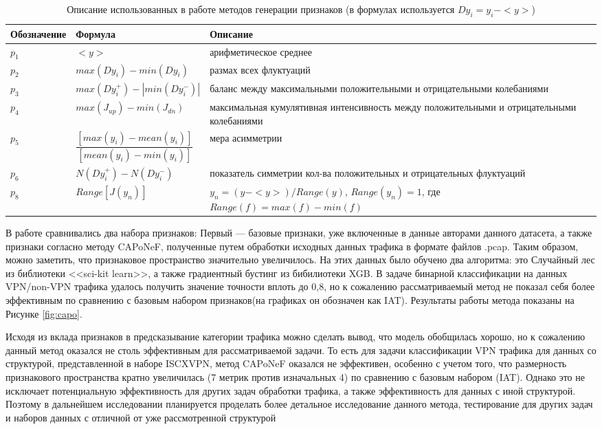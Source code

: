 \begin{table}[h]
	\centering
	\caption{Описание использованных в работе методов генерации признаков (в формулах используется $Dy_i = y_i -<y>$)}
	\begin{tabular}{|>{\centering\arraybackslash}p{3cm}|>{\centering\arraybackslash}p{6cm}|>{\centering\arraybackslash}p{7cm}|}
		\hline
		Обозначение & Формула & Описание \\ 
		\hline
		$p_1$ & $<y>$ & арифметическое среднее \\
		\hline
		$p_2$ & $max(Dy_i) - min(Dy_i)$ & размах всех флуктуаций \\
		\hline
		$p_3$ & $max(Dy_i^+) - |min(Dy_i^-)|$ & баланс между максимальными положительными и отрицательными колебаниями \\
		\hline
		$p_4$ & $max(J_{up})- min(J_{dn})$ & максимальная кумулятивная интенсивность между положительными и отрицательными колебаниями\\
		\hline
		$p_5$ & $ \dfrac{[max(y_i)-mean(y_i)]}{[mean(y_i)-min(y_i)]}$ & мера асимметрии \\
		\hline
		$p_6$ & $N(Dy_i^+)-N(Dy_i^-)$ & показатель симметрии  кол-ва положительных и отрицательных  флуктуаций \\
		\hline
		$p_8$ & $Range[J(y_n)]$ & $y_n = (y - <y>)/Range(y)$, $Range(y_n)=1$, где $Range(f)=max(f)-min(f)$ \\
		\hline
	\end{tabular}
	\label{tab:caponef}
\end{table}




В работе сравнивались два набора признаков: Первый — базовые признаки, уже включенные в данные авторами данного датасета, а также признаки согласно методу CAPoNeF, полученные путем обработки исходных данных трафика в формате файлов .pcap.  Таким образом, можно заметить, что признаковое пространство значительно увеличилось. На этих данных было обучено два алгоритма: это Случайный лес из библиотеки <<sci-kit learn>>,  а также градиентный бустинг  из бибилиотеки XGB. В задаче бинарной классификации на данных VPN/non-VPN трафика удалось получить значение точности вплоть до 0,8, но к сожалению рассматриваемый метод не показал себя более эффективным по сравнению с базовым набором признаков(на графиках он обозначен как IAT). Результаты работы метода показаны на Рисунке  \ref{fig:capo}.

Исходя из вклада признаков в предсказывание категории трафика можно сделать вывод, что модель обобщилась хорошо, но к сожалению данный метод оказался не столь эффективным для рассматриваемой задачи. То есть для задачи классификации VPN трафика для данных со структурой, представленной в наборе ISCXVPN, метод CAPoNeF оказался не эффективен, особенно с учетом того, что размерность признакового пространства кратно увеличилась (7 метрик против изначальных 4) по сравнению с базовым набором (IAT). Однако это не исключает потенциальную эффективность для других задач обработки трафика, а также эффективность для данных с иной структурой. Поэтому в дальнейшем исследовании планируется проделать более детальное исследование данного метода, тестирование для других задач и наборов данных с отличной от уже рассмотренной структурой


